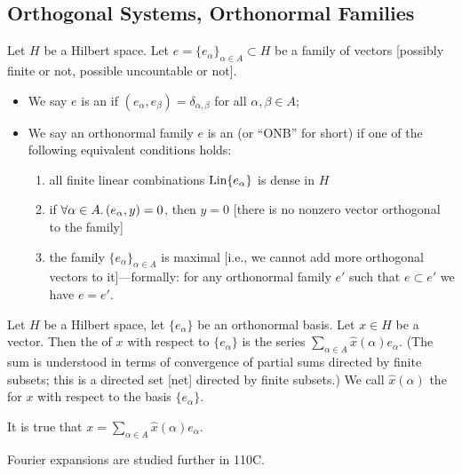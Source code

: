 \subsection{Orthogonal Systems, Orthonormal Families}

\begin{definition}
Let $H$ be a Hilbert space. Let $e=\{e_{\alpha}\}_{\alpha\in A}\subset H$
be a family of vectors [possibly finite or not, possible uncountable or not].
\begin{itemize}
\item We say $e$ is an  if
  $(e_{\alpha},e_{\beta})=\delta_{\alpha,\beta}$ for all
  $\alpha,\beta\in A$;
\item We say an orthonormal family $e$ is an 
  (or ``ONB'' for short) if one of the following equivalent conditions holds: 
\begin{enumerate}
\item all finite linear combinations $\operatorname{Lin}\{e_{\alpha}\}$ is dense in $H$
\item if $\forall\alpha\in A\ldotp(e_{\alpha},y)=0$, then $y=0$ [there
  is no nonzero vector orthogonal to the family]
\item the family $\{e_{\alpha}\}_{\alpha\in A}$ is maximal [i.e., we
  cannot add more orthogonal vectors to it]---formally: for any
  orthonormal family $e'$ such that $e\subset e'$ we have $e=e'$.
\end{enumerate}
\end{itemize}
\end{definition}

\begin{definition}
Let $H$ be a Hilbert space, let $\{e_{\alpha}\}$ be an orthonormal
basis. Let $x\in H$ be a vector. Then the 
of $x$ with respect to $\{e_{\alpha}\}$ is the series $\sum_{\alpha\in A}\widehat{x}(\alpha)e_{\alpha}$.
(The sum is understood in terms of convergence of partial sums
directed by finite subsets; this is a directed set [net] directed by
finite subsets.)
We call $\widehat{x}(\alpha)$ the  for
$x$ with respect to the basis $\{e_{\alpha}\}$. 

It is true that $x=\sum_{\alpha\in A}\widehat{x}(\alpha)e_{\alpha}$.
\end{definition}

\begin{node}
Fourier expansions are studied further in 110C.
\end{node}

